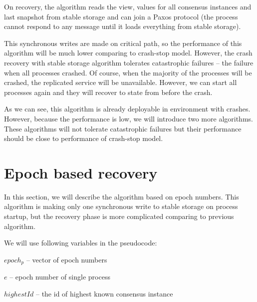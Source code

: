 On recovery, the algorithm reads the view, values for all consensus instances and last snapshot from stable storage and can join a Paxos protocol (the process cannot respond to any message until it loads everything from stable storage).

This synchronous writes are made on critical path, so the performance of this algorithm will be much lower comparing to crash-stop model. However, the crash recovery with stable storage algorithm tolerates catastrophic failures -- the failure when all processes crashed. Of course, when the majority of the processes will be crashed, the replicated service will be unavailable. However, we can start all processes again and they will recover to state from before the crash.

As we can see, this algorithm is already deployable in environment with crashes. However, because the performance is low, we will introduce two more algorithms. These algorithms will not tolerate catastrophic failures but their performance should be close to performance of crash-stop model.

\section{Epoch based recovery}
\label{sec:epoch_ss}

In this section, we will describe the algorithm based on epoch numbers. This algorithm is making only one synchronous write to stable storage on process startup, but the recovery phase is more complicated comparing to previous algorithm.

We will use following variables in the pseudocode:
\begin{tightList}[\setlength{\labelwidth}{20em} \setlength{\leftmargin}{3\leftmargin}]
  \item[$epoch_p$] -- vector of epoch numbers
  \item[$e$] -- epoch number of single process
  \item[$highestId$] -- the id of highest known consensus instance
\end{tightList}

